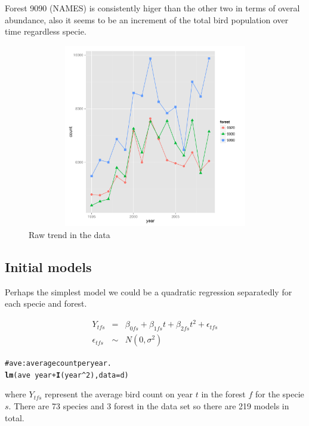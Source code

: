 \documentclass{article}\usepackage{graphicx, color}
\makeatletter
\newcommand{\hlfunctioncall}[1]{\textcolor[rgb]{0.501960784313725,0,0.329411764705882}{\textbf{#1}}}%
\newcommand{\hlcomment}[1]{\textcolor[rgb]{0.180392156862745,0.6,0.341176470588235}{#1}}%
\newenvironment{kframe}{%
 \def\at@end@of@kframe{}%
 \ifinner\ifhmode%
  \def\at@end@of@kframe{\end{minipage}}%
  \begin{minipage}{\columnwidth}%
 \fi\fi%
 \def\FrameCommand##1{\hskip\@totalleftmargin \hskip-\fboxsep
 \colorbox{shadecolor}{##1}\hskip-\fboxsep
     \hskip-\linewidth \hskip-\@totalleftmargin \hskip\columnwidth}%
 \MakeFramed {\advance\hsize-\width
   \@totalleftmargin\z@ \linewidth\hsize
   \@setminipage}}%
 {\par\unskip\endMakeFramed%
 \at@end@of@kframe}
\newenvironment{knitrout}{}{} %
\makeatother
\begin{document}
Forest 9090 (NAMES) is consistently higer than the other two in terms of overal abundance, also it seems to be an increment of the total bird population over time regardless specie.

\begin{figure}[h!]
\centering
\includegraphics[height=8cm, width=14cm]{rawtrend.pdf}
\caption{Raw trend in the data}
\end{figure}

\subsection{Initial models} 

Perhaps the simplest model we could be a quadratic regression separatedly for each specie and forest. 

\begin{eqnarray}
\nonumber Y_{tfs} &=&  \beta_{0fs} + \beta_{1fs}t + \beta_{2fs}t^2 + \epsilon_{tfs}  \\
\epsilon_{tfs} &\sim& N(0,\sigma^2)
\label{mod1}
\end{eqnarray}

\begin{knitrout}
\color{fgcolor}\begin{kframe}
\begin{alltt}
\hlcomment{# ave : average count per year.}
\hlfunctioncall{lm}(ave ~ year + \hlfunctioncall{I}(year^2), data = d)
\end{alltt}
\end{kframe}
\end{knitrout}



where $Y_{tfs}$ represent the average bird count on year $t$ in the forest $f$ for the specie $s$. There are 73 species and 3 forest in the data set so there are 219 models in total. 
\end{document}
